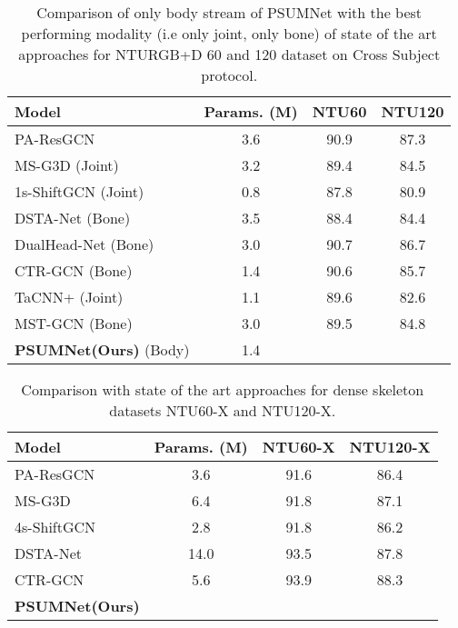 \documentclass[runningheads]{llncs}
\begin{document}
\begin{table}[!t]
  \resizebox{0.75\linewidth}{!} 
    {\begin{tabular}{l|c|cc}
    \toprule
    Model & Params. (M) &  NTU60 & NTU120\\
    \midrule
PA-ResGCN\cite{song2020stronger} & 3.6 & 90.9 & 87.3 \\
    MS-G3D (Joint)\cite{liu2020disentangling} & 3.2 & 89.4 & 84.5 \\
    1s-ShiftGCN (Joint)\cite{cheng2020shiftgcn} & 0.8 & 87.8 & 80.9\\
    DSTA-Net (Bone)\cite{dstanet_accv2020} & 3.5 & 88.4 & 84.4\\
    DualHead-Net (Bone)\cite{chen2021learning} & 3.0 & 90.7 & 86.7 \\
    CTR-GCN (Bone)\cite{chen2021channel} & 1.4 & 90.6 & 85.7\\
    TaCNN+ (Joint)\cite{xu2021topology} & 1.1 & 89.6 & 82.6\\
    MST-GCN (Bone)\cite{chen2021multi} & 3.0 & 89.5 & 84.8\\
    \midrule
    \textbf{PSUMNet(Ours)} (Body) & 1.4 &  & \\
    
  \bottomrule
  
\end{tabular}
}
\caption{\label{tab:results_single_stream}Comparison of only body stream of PSUMNet with the best performing modality (i.e only joint, only bone) of state of the art approaches for NTURGB+D 60 and 120 dataset on Cross Subject protocol.}
\end{table}

\begin{table}[!t]
  \resizebox{0.75\linewidth}{!} 
    {\begin{tabular}{l|c|cc}
    \toprule
    Model & Params. (M) &  NTU60-X & NTU120-X\\
    \midrule
PA-ResGCN\cite{song2020stronger} & 3.6 & 91.6 & 86.4 \\
    MS-G3D\cite{liu2020disentangling} & 6.4 & 91.8 & 87.1 \\
    4s-ShiftGCN\cite{cheng2020shiftgcn} & 2.8 & 91.8 & 86.2\\
    DSTA-Net\cite{dstanet_accv2020} & 14.0 & 93.5 & 87.8\\
    CTR-GCN \cite{chen2021channel} & 5.6 & 93.9 & 88.3\\
    \midrule
    \textbf{PSUMNet(Ours)} &  &  & \\
  \bottomrule
\end{tabular}
}
\caption{\label{tab:ntux_results}Comparison with state of the art approaches for dense skeleton datasets NTU60-X and NTU120-X.}
\end{table}
\end{document}
